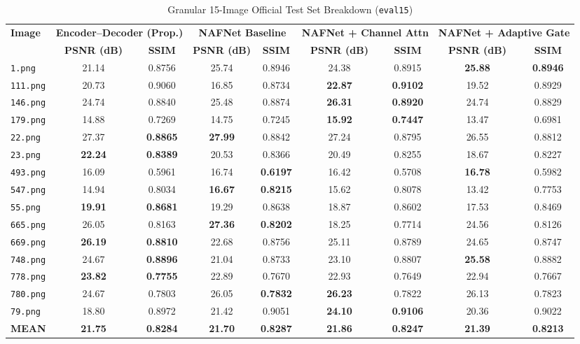 \documentclass[journal,onecolumn,11pt]{IEEEtran}
\begin{document}
\begin{table}[htbp]
\caption{Granular 15-Image Official Test Set Breakdown (\texttt{eval15})}
\label{tab:per_image}
\centering
\begin{tabular}{@{}lcccccccc@{}}
\toprule
\textbf{Image} & \multicolumn{2}{c}{\textbf{Encoder--Decoder (Prop.)}} & \multicolumn{2}{c}{\textbf{NAFNet Baseline}} & \multicolumn{2}{c}{\textbf{NAFNet + Channel Attn}} & \multicolumn{2}{c}{\textbf{NAFNet + Adaptive Gate}} \\
\cmidrule(lr){2-3} \cmidrule(lr){4-5} \cmidrule(lr){6-7} \cmidrule(lr){8-9}
& \textbf{PSNR (dB)} & \textbf{SSIM} & \textbf{PSNR (dB)} & \textbf{SSIM} & \textbf{PSNR (dB)} & \textbf{SSIM} & \textbf{PSNR (dB)} & \textbf{SSIM} \\
\midrule
\texttt{1.png}   & 21.14 & 0.8756 & 25.74 & 0.8946 & 24.38 & 0.8915 & \textbf{25.88} & \textbf{0.8946} \\
\texttt{111.png} & 20.73 & 0.9060 & 16.85 & 0.8734 & \textbf{22.87} & \textbf{0.9102} & 19.52 & 0.8929 \\
\texttt{146.png} & 24.74 & 0.8840 & 25.48 & 0.8874 & \textbf{26.31} & \textbf{0.8920} & 24.74 & 0.8829 \\
\texttt{179.png} & 14.88 & 0.7269 & 14.75 & 0.7245 & \textbf{15.92} & \textbf{0.7447} & 13.47 & 0.6981 \\
\texttt{22.png}  & 27.37 & \textbf{0.8865} & \textbf{27.99} & 0.8842 & 27.24 & 0.8795 & 26.55 & 0.8812 \\
\texttt{23.png}  & \textbf{22.24} & \textbf{0.8389} & 20.53 & 0.8366 & 20.49 & 0.8255 & 18.67 & 0.8227 \\
\texttt{493.png} & 16.09 & 0.5961 & 16.74 & \textbf{0.6197} & 16.42 & 0.5708 & \textbf{16.78} & 0.5982 \\
\texttt{547.png} & 14.94 & 0.8034 & \textbf{16.67} & \textbf{0.8215} & 15.62 & 0.8078 & 13.42 & 0.7753 \\
\texttt{55.png}  & \textbf{19.91} & \textbf{0.8681} & 19.29 & 0.8638 & 18.87 & 0.8602 & 17.53 & 0.8469 \\
\texttt{665.png} & 26.05 & 0.8163 & \textbf{27.36} & \textbf{0.8202} & 18.25 & 0.7714 & 24.56 & 0.8126 \\
\texttt{669.png} & \textbf{26.19} & \textbf{0.8810} & 22.68 & 0.8756 & 25.11 & 0.8789 & 24.65 & 0.8747 \\
\texttt{748.png} & 24.67 & \textbf{0.8896} & 21.04 & 0.8733 & 23.10 & 0.8807 & \textbf{25.58} & 0.8882 \\
\texttt{778.png} & \textbf{23.82} & \textbf{0.7755} & 22.89 & 0.7670 & 22.93 & 0.7649 & 22.94 & 0.7667 \\
\texttt{780.png} & 24.67 & 0.7803 & 26.05 & \textbf{0.7832} & \textbf{26.23} & 0.7822 & 26.13 & 0.7823 \\
\texttt{79.png}  & 18.80 & 0.8972 & 21.42 & 0.9051 & \textbf{24.10} & \textbf{0.9106} & 20.36 & 0.9022 \\
\midrule
\textbf{MEAN}    & \textbf{21.75} & \textbf{0.8284} & \textbf{21.70} & \textbf{0.8287} & \textbf{21.86} & \textbf{0.8247} & \textbf{21.39} & \textbf{0.8213} \\
\bottomrule
\end{tabular}
\end{table}
\end{document}
